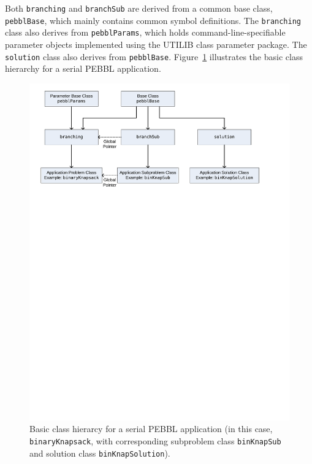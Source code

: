 Both \texttt{branching} and
\texttt{branchSub} are derived from a common base class,
\texttt{pebblBase}, which mainly contains common symbol
definitions. The \texttt{branching} class also derives from
\texttt{pebblParams}, which holds command-line-specifiable
parameter objects implemented using the UTILIB class parameter
package.  The \texttt{solution} class also derives from
\texttt{pebblBase}.   Figure~\ref{fig:globalsub} illustrates the basic class
hierarchy for a serial PEBBL application.

\begin{figure}[tbp]
\begin{center}
\includegraphics[width=\textwidth]{globalsub}
\vspace{-0.5in}
\end{center}
\caption{Basic class hierarcy for a serial PEBBL application (in this
case, 
\texttt{binaryKnapsack}, with corresponding subproblem class
\texttt{binKnapSub} and solution class \texttt{binKnapSolution}).}
\label{fig:globalsub}
\end{figure}


